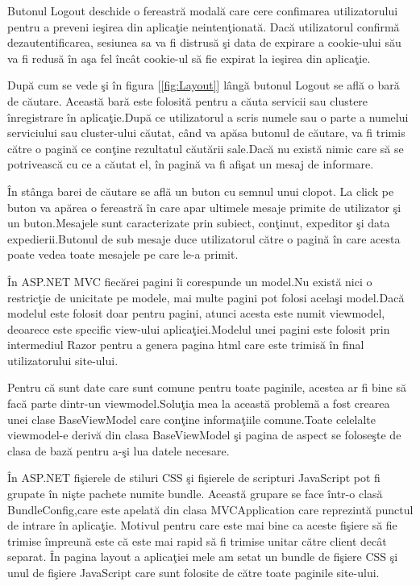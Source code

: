\documentclass[a4paper,12pt]{report}
\let\oldref\ref
\renewcommand{\ref}[1]{[\oldref{#1}]}
\begin{document}
Butonul Logout deschide o fereastr\u a modal\u a care cere confimarea utilizatorului pentru a preveni
ie\c sirea din aplica\c tie neinten\c tionat\u a. Dac\u a utilizatorul confirm\u a dezautentificarea,
sesiunea sa va fi distrus\u a \c si data de expirare a cookie-ului s\u au va fi redus\u a \^in a\c sa fel
\^inc\^at cookie-ul s\u a fie expirat la ie\c sirea din aplica\c tie.

Dup\u a cum se vede \c si \^in figura \ref{fig:Layout} l\^ang\u a butonul Logout se afl\u a o bar\u a de 
c\u autare. Aceast\u a bar\u a este folosit\u a pentru a c\u auta servicii sau clustere \^inregistrare \^in 
aplica\c tie.Dup\u a ce utilizatorul a scris numele sau o parte a numelui serviciului sau cluster-ului c\u autat,
c\^and va ap\u asa butonul de c\u autare, va fi trimis c\u atre o pagin\u a ce con\c tine rezultatul c\u aut\u arii
sale.Dac\u a nu exist\u a nimic care s\u a se potriveasc\u a cu ce a c\u autat el, \^in pagin\u a va fi afi\c sat un mesaj
de informare.

\^In st\^ anga barei de c\u autare se afl\u a un buton cu semnul unui clopot. La click pe buton va ap\u area
o fereastr\u a \^in care apar ultimele mesaje primite de utilizator \c si un buton.Mesajele sunt caracterizate 
prin subiect, con\c tinut, expeditor \c si data expedierii.Butonul de sub mesaje duce utilizatorul c\u atre o 
pagin\u a \^in care acesta poate vedea toate mesajele pe care le-a primit.

\^In ASP.NET MVC fiec\u arei pagini \^ii corespunde un model.Nu exist\u a nici o restric\c tie de unicitate
pe modele, mai multe pagini pot folosi acela\c si model.Dac\u a modelul este folosit doar pentru pagini,
atunci acesta este numit viewmodel, deoarece este specific view-ului aplica\c tiei.Modelul unei pagini 
este folosit prin intermediul Razor pentru a genera pagina html care este trimis\u a \^in final utilizatorului
site-ului.

Pentru c\u a sunt date care sunt comune pentru toate paginile, acestea ar fi bine s\u a fac\u a parte dintr-un
viewmodel.Solu\c tia mea la aceast\u a problem\u a a fost crearea unei clase BaseViewModel care con\c tine informa\c tiile 
comune.Toate celelalte viewmodel-e deriv\u a din clasa BaseViewModel \c si pagina de aspect se folose\c ste de clasa
de baz\u a pentru a-\c si lua datele necesare.

\^In ASP.NET fi\c sierele de stiluri CSS \c si fi\c sierele de scripturi JavaScript pot fi grupate \^in ni\c ste 
pachete numite bundle. Aceast\u a grupare se face \^intr-o clas\u a BundleConfig,care este apelat\u a din clasa 
MVCApplication care reprezint\u a punctul de intrare \^in aplica\c tie. Motivul pentru care este mai bine ca aceste fi\c siere s\u a fie trimise \^impreun\u a 
este c\u a este mai rapid s\u a fi trimise unitar c\u atre client dec\^at separat. \^In pagina layout a aplica\c tiei 
mele am setat un  bundle de fi\c siere CSS \c si unul de fi\c siere JavaScript care sunt folosite de c\u atre toate paginile
site-ului.
\end{document}
